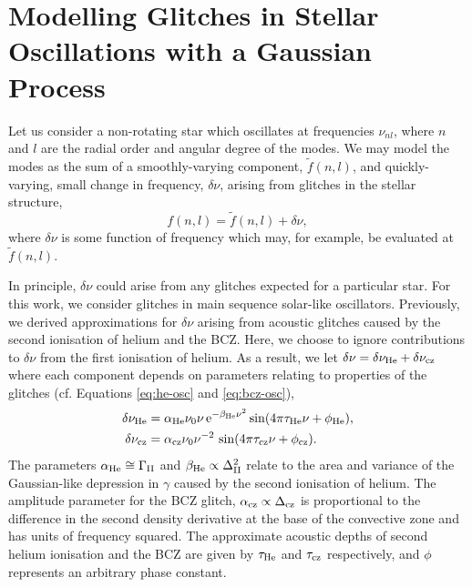 %
%
%
%
%
\chapter[Modelling Glitches in Stellar Oscillations]{Modelling Glitches in Stellar Oscillations with a Gaussian Process}\label{chap:glitch-gp}

Let us consider a non-rotating star which oscillates at frequencies \(\nu_{nl}\), where \(n\) and \(l\) are the radial order and angular degree of the modes. We may model the modes as the sum of a smoothly-varying component, \(\tilde{f}(n, l)\), and quickly-varying, small change in frequency, \(\delta\nu\), arising from glitches in the stellar structure,
%
\begin{equation}
    f(n, l) = \tilde{f}(n, l) + \delta\nu,\label{eq:general-glitch}
\end{equation}
%
where \(\delta\nu\) is some function of frequency which may, for example, be evaluated at \(\tilde{f}(n, l)\).

In principle, \(\delta\nu\) could arise from any glitches expected for a particular star. For this work, we consider glitches in main sequence solar-like oscillators. Previously, we derived approximations for \(\delta\nu\) arising from acoustic glitches caused by the second ionisation of helium and the BCZ. Here, we choose to ignore contributions to \(\delta\nu\) from the first ionisation of helium. As a result, we let \(\delta\nu = \delta\nu_{{\mathrm{He}}} + \delta\nu_{{\mathrm{cz}}}\) where each component depends on parameters relating to properties of the glitches (cf. Equations \ref{eq:he-osc} and \ref{eq:bcz-osc}),
%
\begin{align}
    \delta\nu_{{\mathrm{He}}} &= \alpha_{{\mathrm{He}}} \nu_0 \nu \, \mathrm{e}^{-\beta_{{\mathrm{He}}} \nu^2} \sin(4\pi\tau_{{\mathrm{He}}}\nu + \phi_{{\mathrm{He}}}), \label{eq:he-glitch}\\
    \delta\nu_{{\mathrm{cz}}} &= \alpha_{{\mathrm{cz}}} \nu_0 \nu^{-2} \, \sin(4\pi\tau_{{\mathrm{cz}}}\nu + \phi_{{\mathrm{cz}}}). \label{eq:bcz-glitch}
\end{align}
%
The parameters \(\alpha_{{\mathrm{He}}} \cong \Gamma_{{\mathrm{II}}}\) and \(\beta_{{\mathrm{He}}} \propto \Delta_{{\mathrm{II}}}^2\) relate to the area and variance of the Gaussian-like depression in \(\gamma\) caused by the second ionisation of helium. The amplitude parameter for the BCZ glitch, \(\alpha_{{\mathrm{cz}}} \propto \Delta_{{\mathrm{cz}}}\) is proportional to the difference in the second density derivative at the base of the convective zone and has units of frequency squared. The approximate acoustic depths of second helium ionisation and the BCZ are given by \(\tau_{{\mathrm{He}}}\) and \(\tau_{{\mathrm{cz}}}\) respectively, and \(\phi\) represents an arbitrary phase constant.

